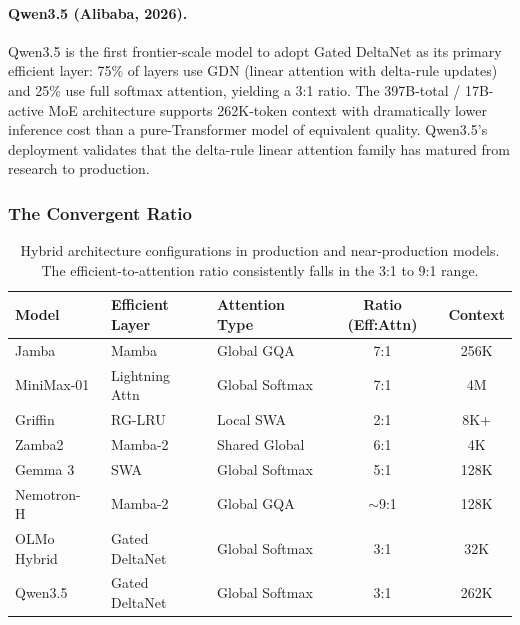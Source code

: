 \documentclass[11pt,a4paper]{article}
\begin{document}
\paragraph{Qwen3.5 (Alibaba, 2026).}
Qwen3.5 is the first frontier-scale model to adopt Gated DeltaNet as its primary efficient layer: 75\% of layers use GDN (linear attention with delta-rule updates) and 25\% use full softmax attention, yielding a 3:1 ratio. The 397B-total / 17B-active MoE architecture supports 262K-token context with dramatically lower inference cost than a pure-Transformer model of equivalent quality. Qwen3.5's deployment validates that the delta-rule linear attention family has matured from research to production.

\subsubsection{The Convergent Ratio}

\begin{table}[t]
\centering
\caption{Hybrid architecture configurations in production and near-production models. The efficient-to-attention ratio consistently falls in the 3:1 to 9:1 range.}
\label{tab:hybrid}
\small
\begin{tabular}{lllcc}
\toprule
\textbf{Model} & \textbf{Efficient Layer} & \textbf{Attention Type} & \textbf{Ratio (Eff:Attn)} & \textbf{Context} \\
\midrule
Jamba~\cite{lieber2024jamba_tr}       & Mamba          & Global GQA     & 7:1  & 256K \\
MiniMax-01~\cite{minimax2025}         & Lightning Attn & Global Softmax & 7:1  & 4M \\
Griffin~\cite{de2024griffin}           & RG-LRU         & Local SWA      & 2:1  & 8K+ \\
Zamba2~\cite{zyphra2024zamba2}        & Mamba-2        & Shared Global  & 6:1  & 4K \\
Gemma 3~\cite{gemma2025gemma3}        & SWA            & Global Softmax & 5:1  & 128K \\
Nemotron-H~\cite{nvidia2025nemotronh} & Mamba-2        & Global GQA     & $\sim$9:1 & 128K \\
OLMo Hybrid                           & Gated DeltaNet & Global Softmax & 3:1  & 32K \\
Qwen3.5                               & Gated DeltaNet & Global Softmax & 3:1  & 262K \\
\bottomrule
\end{tabular}
\end{table}
\end{document}
